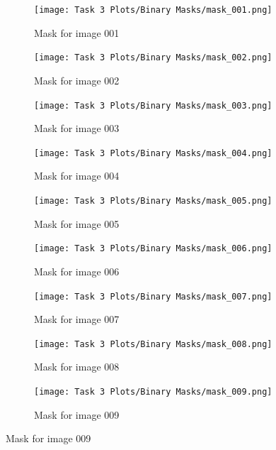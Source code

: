 \documentclass[11pt]{report}
\begin{document}
\begin{figure}[H]
    \centering
    \begin{subfigure}{0.24\textwidth}
        \centering
        \texttt{[image: Task 3 Plots/Binary Masks/mask\_001.png]}
        \caption{Mask for image 001}
        \label{fig:kbinmask1}
    \end{subfigure}
    \begin{subfigure}{0.24\textwidth}
        \centering
        \texttt{[image: Task 3 Plots/Binary Masks/mask\_002.png]}
        \caption{Mask for image 002}
        \label{fig:kbinmask2}
    \end{subfigure}
    \begin{subfigure}{0.24\textwidth}
        \centering
        \texttt{[image: Task 3 Plots/Binary Masks/mask\_003.png]}
        \caption{Mask for image 003}
        \label{fig:kbinmask3}
    \end{subfigure}
    \begin{subfigure}{0.24\textwidth}
        \centering
        \texttt{[image: Task 3 Plots/Binary Masks/mask\_004.png]}
        \caption{Mask for image 004}
        \label{fig:kbinmask4}
    \end{subfigure}
    \begin{subfigure}{0.24\textwidth}
        \centering
        \texttt{[image: Task 3 Plots/Binary Masks/mask\_005.png]}
        \caption{Mask for image 005}
        \label{fig:kbinmask5}
    \end{subfigure}
    \begin{subfigure}{0.24\textwidth}
        \centering
        \texttt{[image: Task 3 Plots/Binary Masks/mask\_006.png]}
        \caption{Mask for image 006}
        \label{fig:kbinmask6}
    \end{subfigure}
    \begin{subfigure}{0.24\textwidth}
        \centering
        \texttt{[image: Task 3 Plots/Binary Masks/mask\_007.png]}
        \caption{Mask for image 007}
        \label{fig:kbinmask7}
    \end{subfigure}
    \begin{subfigure}{0.24\textwidth}
        \centering
        \texttt{[image: Task 3 Plots/Binary Masks/mask\_008.png]}
        \caption{Mask for image 008}
        \label{fig:kbinmask8}
    \end{subfigure}
    \begin{subfigure}{0.24\textwidth}
        \centering
        \texttt{[image: Task 3 Plots/Binary Masks/mask\_009.png]}
        \caption{Mask for image 009}
        \label{fig:kbinmask9}

\end{subfigure}
\end{figure}
\end{document}
